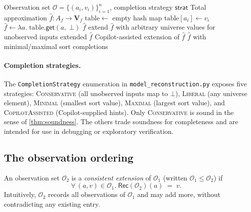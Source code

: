 \documentclass[11pt]{article}
\newcommand{\PMR}{\textsc{Pmr}}            %
\newcommand{\ObsSet}{\mathcal{O}}          %
\newcommand{\RecAlg}{\mathsf{Rec}}         %
\newcommand{\PVal}{\mathbf{V}}             %
\begin{document}
\begin{algorithm}
\caption{Partiality Model Reconstruction (\PMR{})}\label{alg:pmr}
\begin{algorithmic}[1]
\Require Observation set $\ObsSet = \{(a_i, v_i)\}_{i=1}^{n}$,
         completion strategy $\mathsf{strat}$
\Ensure  Total approximation $\hat{f} : A_f \to \PVal_f$
\State $\mathrm{table} \gets $ empty hash map
\For{each $(a_i, v_i) \in \ObsSet$}
  \State $\mathrm{table}[a_i] \gets v_i$
\EndFor
\State $\hat{f} \gets \lambda a.\; \mathrm{table}.\mathsf{get}(a,\;\bot)$
  \State \Return $\hat{f}$  
  \State extend $\hat{f}$ with arbitrary universe values for unobserved inputs
  \State \Return extended $\hat{f}$
  \State \Return Copilot-assisted extension of $\hat{f}$
\Else
  \State \Return $\hat{f}$ with minimal/maximal sort completions
\EndIf
\end{algorithmic}
\end{algorithm}

\paragraph{Completion strategies.}
The \texttt{CompletionStrategy} enumeration in
\texttt{model\_reconstruction.py} exposes five strategies:
\textsc{Conservative} (all unobserved inputs map to $\bot$),
\textsc{Liberal} (any universe element),
\textsc{Minimal} (smallest sort value),
\textsc{Maximal} (largest sort value), and
\textsc{CopilotAssisted} (Copilot-supplied hints).  Only
\textsc{Conservative} is sound in the sense of \cref{thm:soundness}.
The others trade soundness for completeness and are intended for
use in debugging or exploratory verification.

\subsection{The observation ordering}

\begin{definition}\label{def:consext}
An observation set $\ObsSet_2$ is a \emph{consistent extension} of
$\ObsSet_1$ (written $\ObsSet_1 \leq \ObsSet_2$) if
\[
  \forall\, (a, v) \in \ObsSet_1.\;
  \RecAlg(\ObsSet_2)(a) \;=\; v.
\]
Intuitively, $\ObsSet_2$ records all observations of $\ObsSet_1$ and
may add more, without contradicting any existing entry.
\end{definition}
\end{document}
